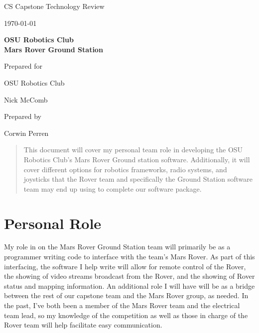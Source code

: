 \documentclass[onecolumn, draftclsnofoot, 10pt, compsoc]{IEEEtran}
\def \CapstoneTeamName{			Ground Station Software Team}
\def \CapstoneTeamNumber{		30}
\def \GroupMemberOne{			}
\def \GroupMemberTwo{			}
\def \GroupMemberThree{			Corwin Perren}
\def \CapstoneProjectName{		OSU Robotics Club\\Mars Rover Ground Station}
\def \CapstoneSponsorCompany{	OSU Robotics Club}
\def \CapstoneSponsorPerson{	Nick McComb}
\def \DocType{	%
				Technology Review
			 }
\newcommand{\NameSigPair}[1]{
  \par
  \makebox[2.75in][r]{#1} 
  \hfill
  \makebox[3.25in]{
      \makebox[2.25in]{\hrulefill} 
      \hfill
      \makebox[.75in]{\hrulefill}
  }
  \par\vspace{-12pt} 
  \textit{
      \tiny\noindent
      \makebox[2.75in]{} 
      \hfill
      \makebox[3.25in]{
          \makebox[2.25in][r]{Signature} 
          \hfill
          \makebox[.75in][r]{Date}
      }
  }
}
\renewcommand{\NameSigPair}[1]{#1}
\begin{document}
\begin{titlepage}
\begin{singlespace}
		\par\vspace{.35in}
		\centering
		\scshape{
			\huge CS Capstone \DocType \par
			{\large\today}\par
			\vspace{.5in}
			\textbf{\Huge\CapstoneProjectName}\par
			\vfill
			{\large Prepared for}\par
			\Huge \CapstoneSponsorCompany\par
			\vspace{5pt}
			{\Large\NameSigPair{\CapstoneSponsorPerson}\par}
			{\large Prepared by }\par
			\vspace{5pt}
			{\Large
				\NameSigPair{\GroupMemberOne}\par
				\NameSigPair{\GroupMemberTwo}\par
				\NameSigPair{\GroupMemberThree}\par
			}
			\vspace{20pt}
            \begin{abstract}
            This document will cover my personal team role in developing the OSU Robotics Club's Mars Rover Ground station software.
            Additionally, it will cover different options for robotics frameworks, radio systems, and joysticks that the Rover team and specifically the Ground Station software team may end up using to complete our software package.
		\end{abstract}
		}
	\end{singlespace}
\end{titlepage}
\newpage
{}
\tableofcontents
\clearpage
\section{Personal Role}
My role in on the Mars Rover Ground Station team will primarily be as a programmer writing code to interface with the team's Mars Rover. 
As part of this interfacing, the software I help write will allow for remote control of the Rover, the showing of video streams broadcast from the Rover, and the showing of Rover status and mapping information.
An additional role I will have will be as a bridge between the rest of our capstone team and the Mars Rover group, as needed.
In the past, I've both been a member of the Mars Rover team and the electrical team lead, so my knowledge of the competition as well as those in charge of the Rover team will help facilitate easy communication.
\end{document}
